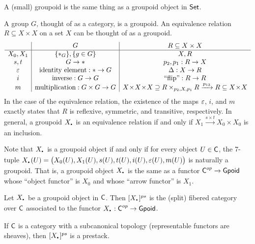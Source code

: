  \begin{remark}
   A (small) groupoid is the same thing as a groupoid object in $\text{\sf Set}$.
 \end{remark}
 \begin{example}
   A group $G$, thought of as a category, is a groupoid. An equivalence relation
   $R\subseteq X\times X$ on a set $X$ can be thought of as a groupoid.
   \[\begin{array}{c|c|c}
      & G & R\subseteq X\times X\\ \hline
     X_0, X_1 & \{\ast_G\}, \{g\in G\} & X, R\\
     s, t & G\to \ast & p_2,p_1:R\to X\\
     \varepsilon & \text{identity element}:\ast \to G & \Delta:X\to R\\
     i & \text{inverse}:G\to G & \text{``flip''}:R\to R\\
     m & \text{multiplication}:G\times G\to G & X\!\times\! X\!\times\!
     X\supseteq R\times_{p_2,X,p_1} R\xrightarrow{p_{13}} R \subseteq X\!\times\! X
   \end{array}\]
   In the case of the equivalence relation, the existence of the maps $\varepsilon$, $i$, and $m$
   exactly states that $R$ is reflexive, symmetric, and transitive, respectively. In
   general, a groupoid $X_\udot$ is an equivalence relation if and only if
   $X_1\xrightarrow{s\times t}X_0\times X_0$ is an inclusion.
 \end{example}
 Note that $X_\udot$ is a groupoid object if and only if for every object $U\in \text{\sf C}$, the
 7-tuple $X_\udot(U)=\bigl(X_0(U),X_1(U),s(U),t(U),i(U),\e(U),m(U)\bigr)$ is naturally a
 groupoid. That is, a groupoid object $X_\udot$ is the same as a functor $\text{\sf C}^{op}\to
 \text{\sf Gpoid}$ whose ``object functor'' is $X_0$ and whose ``arrow functor'' is $X_1$.
 \begin{definition}
   Let $X_\udot$ be a groupoid object in $\text{\sf C}$. Then $[X_\udot]^{ps}$ is the (split)
   fibered category over $\text{\sf C}$ associated to the functor $X_\udot:\C^{op}\to \gpoid$.
 \end{definition}
 \begin{lemma}
   If $\text{\sf C}$ is a category with a subcanonical topology (representable functors are
   sheaves), then $[X_\udot]^{ps}$ is a prestack.
 \end{lemma}
